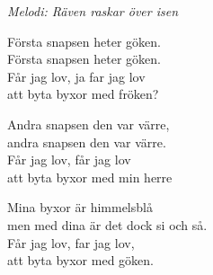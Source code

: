 {\footnotesize\textit{Melodi: Räven raskar över isen}}\par
\vspace{10pt}
Första snapsen heter göken.\\
Första snapsen heter göken.\\
Får jag lov, ja far jag lov\\
att byta byxor med fröken?\par
\vspace{10pt}
Andra snapsen den var värre,\\
andra snapsen den var värre.\\
Får jag lov, får jag lov\\
att byta byxor med min herre\par
\vspace{10pt}
Mina byxor är himmelsblå\\
men med dina är det dock si och så.\\
Får jag lov, far jag lov,\\
att byta byxor med göken.
